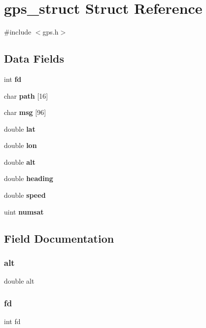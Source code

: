 \section{gps\+\_\+struct Struct Reference}
\label{structgps__struct}


{\ttfamily \#include $<$gps.\+h$>$}

\subsection*{Data Fields}
\begin{DoxyCompactItemize}
\item 
int \textbf{ fd}
\item 
char \textbf{ path} [16]
\item 
char \textbf{ msg} [96]
\item 
double \textbf{ lat}
\item 
double \textbf{ lon}
\item 
double \textbf{ alt}
\item 
double \textbf{ heading}
\item 
double \textbf{ speed}
\item 
uint \textbf{ numsat}
\end{DoxyCompactItemize}


\subsection{Field Documentation}
\mbox{\label{structgps__struct_ad28150484129ecb23959cec99543698c}} 
\subsubsection{alt}
{\footnotesize\ttfamily double alt}

\mbox{\label{structgps__struct_a6f8059414f0228f0256115e024eeed4b}} 
\subsubsection{fd}
{\footnotesize\ttfamily int fd}

\mbox{\label{structgps__struct_ae024163074f229a06b7ea69b190e466d}} 
